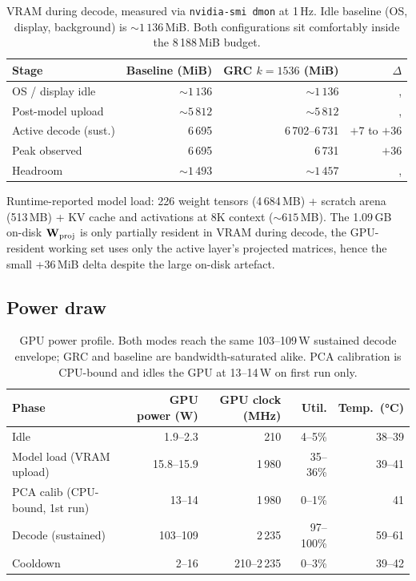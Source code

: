 \documentclass[11pt]{article}
\begin{document}
\begin{table}[h]\centering\footnotesize
\caption{VRAM during decode, measured via \texttt{nvidia-smi dmon} at 1\,Hz.
Idle baseline (OS, display, background) is ${\sim}1\,136$\,MiB. Both
configurations sit comfortably inside the 8\,188\,MiB budget.}
\begin{tabular}{@{}lrrr@{}}
\toprule
Stage & Baseline (MiB) & GRC $k{=}1536$ (MiB) & $\Delta$ \\
\midrule
OS / display idle      & ${\sim}1\,136$        & ${\sim}1\,136$        & , \\
Post-model upload      & ${\sim}5\,812$        & ${\sim}5\,812$        & , \\
Active decode (sust.)  & 6\,695                & 6\,702--6\,731        & $+7$ to $+36$\\
Peak observed          & 6\,695                & 6\,731                & $+36$\\
Headroom               & ${\sim}1\,493$        & ${\sim}1\,457$        & , \\
\bottomrule
\end{tabular}
\end{table}

Runtime-reported model load: 226 weight tensors (4\,684\,MB) +
scratch arena (513\,MB) + KV cache and activations at 8K context
(${\sim}615$\,MB). The 1.09\,GB on-disk $\mathbf{W}_\text{proj}$ is only
partially resident in VRAM during decode, the GPU-resident working
set uses only the active layer's projected matrices, hence the small +36\,MiB
delta despite the large on-disk artefact.

\subsection{Power draw}

\begin{table}[h]\centering\footnotesize
\caption{GPU power profile. Both modes reach the same 103--109\,W sustained
decode envelope; GRC and baseline are bandwidth-saturated alike. PCA
calibration is CPU-bound and idles the GPU at 13--14\,W on first run only.}
\begin{tabular}{@{}lrrrr@{}}
\toprule
Phase & GPU power (W) & GPU clock (MHz) & Util. & Temp.\ (°C)\\
\midrule
Idle                       & 1.9--2.3   & 210         & 4--5\%     & 38--39\\
Model load (VRAM upload)   & 15.8--15.9 & 1\,980      & 35--36\%   & 39--41\\
PCA calib (CPU-bound, 1st run)
                           & 13--14     & 1\,980      & 0--1\%     & 41\\
Decode (sustained)         & 103--109   & 2\,235      & 97--100\%  & 59--61\\
Cooldown                   & 2--16      & 210--2\,235 & 0--3\%     & 39--42\\
\bottomrule
\end{tabular}
\end{table}
\end{document}
